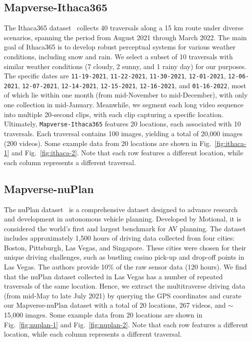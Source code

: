 \subsection{Mapverse-Ithaca365}
\label{subsec:ithaca-appendix}
The Ithaca365 dataset~\cite{diaz2022ithaca365} collects 40 traversals along a 15 km route under diverse scenarios, spanning the period from August 2021 through March 2022. The main goal of Ithaca365 is to develop robust perceptual systems for various weather conditions, including snow and rain. We select a subset of 10 traversals with similar weather conditions (7 cloudy, 2 sunny, and 1 rainy day) for our purposes. The specific dates are \texttt{11-19-2021}, \texttt{11-22-2021}, \texttt{11-30-2021}, \texttt{12-01-2021}, \texttt{12-06-2021}, \texttt{12-07-2021}, \texttt{12-14-2021}, \texttt{12-15-2021}, \texttt{12-16-2021}, and \texttt{01-16-2022}, most of which lie within one month (from mid-November to mid-December), with only one collection in mid-January. Meanwhile, we segment each long video sequence into multiple 20-second clips, with each clip capturing a specific location. Ultimately, \texttt{Mapverse-Ithaca365} features 20 locations, each associated with 10 traversals. Each traversal contains 100 images, yielding a total of 20,000 images (200 videos). Some example data from 20 locations are shown in Fig.~\ref{fig:ithaca-1} and Fig.~\ref{fig:ithaca-2}. Note that each row features a different location, while each column represents a different traversal.


\subsection{Mapverse-nuPlan}
\label{subsec:nuplan-appendix}
The nuPlan dataset~\cite{karnchanachari2024towards} is a comprehensive dataset designed to advance research and development in autonomous vehicle planning. Developed by Motional, it is considered the world's first and largest benchmark for AV planning. The dataset includes approximately 1,500 hours of driving data collected from four cities: Boston, Pittsburgh, Las Vegas, and Singapore. These cities were chosen for their unique driving challenges, such as bustling casino pick-up and drop-off points in Las Vegas. The authors provide 10\% of the raw sensor data (120 hours). We find that the nuPlan dataset collected in Las Vegas has a number of repeated traversals of the same location. Hence, we extract the multitraverse driving data (from mid-May to late July 2021) by querying the GPS coordinates and curate our Mapverse-nuPlan dataset with a total of 20 locations, 267 videos, and $\sim$15,000 images. Some example data from 20 locations are shown in Fig.~\ref{fig:nuplan-1} and Fig.~\ref{fig:nuplan-2}. Note that each row features a different location, while each column represents a different traversal.

